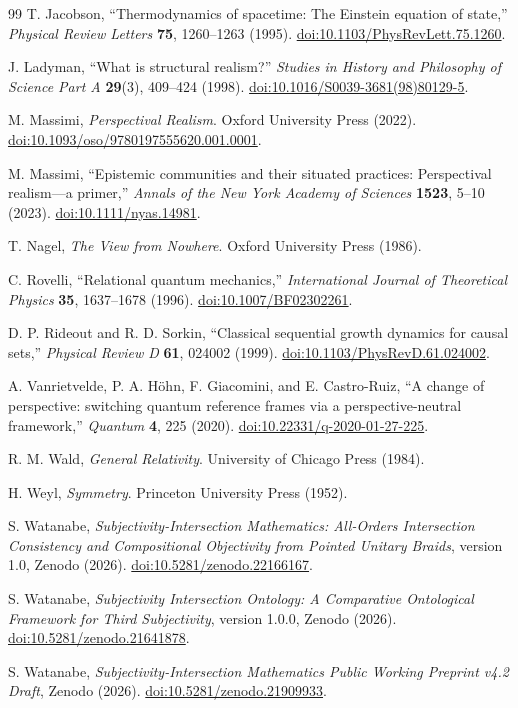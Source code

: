 \documentclass[11pt]{article}
\theoremstyle{definition}
\theoremstyle{remark}
\begin{document}
\begin{thebibliography}{99}
T. Jacobson, ``Thermodynamics of spacetime: The Einstein equation of state,'' \emph{Physical Review Letters} \textbf{75}, 1260--1263 (1995). \href{https://doi.org/10.1103/PhysRevLett.75.1260}{doi:10.1103/PhysRevLett.75.1260}.

J. Ladyman, ``What is structural realism?'' \emph{Studies in History and Philosophy of Science Part A} \textbf{29}(3), 409--424 (1998). \href{https://doi.org/10.1016/S0039-3681(98)80129-5}{doi:10.1016/S0039-3681(98)80129-5}.

M. Massimi, \emph{Perspectival Realism}. Oxford University Press (2022). \href{https://doi.org/10.1093/oso/9780197555620.001.0001}{doi:10.1093/oso/9780197555620.001.0001}.

M. Massimi, ``Epistemic communities and their situated practices: Perspectival realism---a primer,'' \emph{Annals of the New York Academy of Sciences} \textbf{1523}, 5--10 (2023). \href{https://doi.org/10.1111/nyas.14981}{doi:10.1111/nyas.14981}.

T. Nagel, \emph{The View from Nowhere}. Oxford University Press (1986).

C. Rovelli, ``Relational quantum mechanics,'' \emph{International Journal of Theoretical Physics} \textbf{35}, 1637--1678 (1996). \href{https://doi.org/10.1007/BF02302261}{doi:10.1007/BF02302261}.

D. P. Rideout and R. D. Sorkin, ``Classical sequential growth dynamics for causal sets,'' \emph{Physical Review D} \textbf{61}, 024002 (1999). \href{https://doi.org/10.1103/PhysRevD.61.024002}{doi:10.1103/PhysRevD.61.024002}.

A. Vanrietvelde, P. A. H\"ohn, F. Giacomini, and E. Castro-Ruiz, ``A change of perspective: switching quantum reference frames via a perspective-neutral framework,'' \emph{Quantum} \textbf{4}, 225 (2020). \href{https://doi.org/10.22331/q-2020-01-27-225}{doi:10.22331/q-2020-01-27-225}.

R. M. Wald, \emph{General Relativity}. University of Chicago Press (1984).

H. Weyl, \emph{Symmetry}. Princeton University Press (1952).

S. Watanabe, \emph{Subjectivity-Intersection Mathematics: All-Orders Intersection Consistency and Compositional Objectivity from Pointed Unitary Braids}, version 1.0, Zenodo (2026). \href{https://doi.org/10.5281/zenodo.22166167}{doi:10.5281/zenodo.22166167}.

S. Watanabe, \emph{Subjectivity Intersection Ontology: A Comparative Ontological Framework for Third Subjectivity}, version 1.0.0, Zenodo (2026). \href{https://doi.org/10.5281/zenodo.21641878}{doi:10.5281/zenodo.21641878}.

S. Watanabe, \emph{Subjectivity-Intersection Mathematics Public Working Preprint v4.2 Draft}, Zenodo (2026). \href{https://doi.org/10.5281/zenodo.21909933}{doi:10.5281/zenodo.21909933}.

\end{thebibliography}
\end{document}
